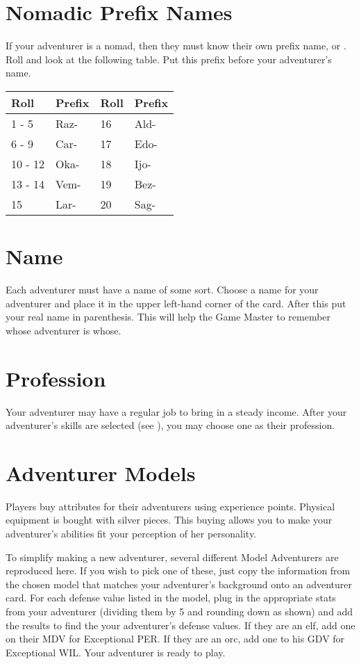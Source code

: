 \begin{multicols*}{2}
\section{Nomadic Prefix Names}
If your adventurer is a nomad, then they must know their own prefix name, or . Roll  and look at the following table. Put this prefix before your adventurer's name.
\vspace{-5pt}
\begin{normbox}
\begin{tabular}{l l|l l}
\small
Roll & Prefix & Roll & Prefix\\
\midrule
1 - 5 & Raz- & 16 & Ald-\\
6 - 9 & Car- & 17 & Edo-\\
10 - 12 & Oka- & 18 & Ijo-\\
13 - 14 & Vem- & 19 & Bez-\\
15 & Lar- & 20 & Sag-\\
\end{tabular}
\end{normbox}
\setlength{\columnsep}{0.25cm}
\section{Name}
Each adventurer must have a name of some sort. Choose a name for your adventurer and place it in the upper left-hand corner of the card. After this put your real name in parenthesis. This will help the Game Master to remember whose adventurer is whose.
\section{Profession}
Your adventurer may have a regular job to bring in a steady income. After your adventurer's skills are selected (see \tcpage{\pageref{create-skills}}), you may choose one as their profession.
\section{Adventurer Models}
Players buy attributes for their adventurers using experience points. Physical equipment is bought with silver pieces. This buying allows you to make your adventurer's abilities fit your perception of her personality.

To simplify making a new adventurer, several different Model Adventurers are reproduced here. If you wish to pick one of these, just copy the information from the chosen model that matches your adventurer's background onto an adventurer card. For each defense value listed in the model, plug in the appropriate stats from your adventurer (dividing them by 5 and rounding down as shown) and add the results to find the your adventurer's defense values. If they are an elf, add one on their MDV for Exceptional PER. If they are an orc, add one to his GDV for Exceptional WIL. Your adventurer is ready to play.


\end{multicols*}
